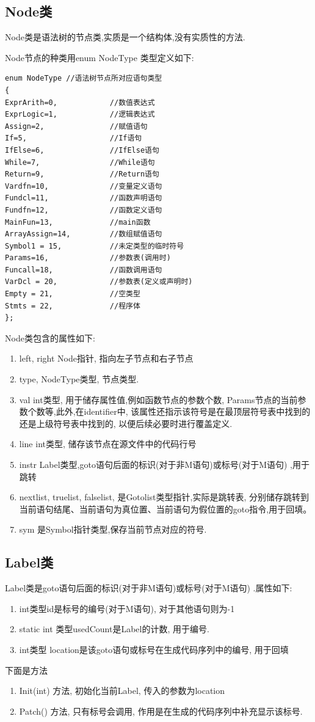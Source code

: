 \documentclass[UTF8]{article}
\begin{document}
\subsection{Node类} 
Node类是语法树的节点类,实质是一个结构体,没有实质性的方法.

Node节点的种类用enum NodeType
类型定义如下:
\begin{lstlisting}
enum NodeType //语法树节点所对应语句类型
{
ExprArith=0,            //数值表达式
ExprLogic=1,            //逻辑表达式
Assign=2,               //赋值语句
If=5,                   //If语句
IfElse=6,               //IfElse语句
While=7,                //While语句
Return=9,               //Return语句
Vardfn=10,              //变量定义语句
Fundcl=11,              //函数声明语句
Fundfn=12,              //函数定义语句
MainFun=13,             //main函数
ArrayAssign=14,         //数组赋值语句
Symbol1 = 15,           //未定类型的临时符号
Params=16,              //参数表(调用时)
Funcall=18,             //函数调用语句
VarDcl = 20,            //参数表(定义或声明时)
Empty = 21,             //空类型
Stmts = 22,             //程序体
};
\end{lstlisting}

Node类包含的属性如下:
\begin{enumerate}[(1)]
\item left, right Node指针, 指向左子节点和右子节点
\item type, NodeType类型, 节点类型.
\item val int类型, 用于储存属性值,例如函数节点的参数个数, Params节点的当前参数个数等,此外,在identifier中, 该属性还指示该符号是在最顶层符号表中找到的还是上级符号表中找到的, 以便后续必要时进行覆盖定义.
\item line int类型, 储存该节点在源文件中的代码行号
\item instr Label类型,goto语句后面的标识(对于非M语句)或标号(对于M语句) ,用于跳转
\item nextlist, truelist, falselist, 是Gotolist类型指针,实际是跳转表, 分别储存跳转到当前语句结尾、当前语句为真位置、当前语句为假位置的goto指令,用于回填。
\item sym 是Symbol指针类型,保存当前节点对应的符号.
\end{enumerate}
\subsection{Label类}
Label类是goto语句后面的标识(对于非M语句)或标号(对于M语句) .属性如下:
\begin{enumerate}[(1)]
\item int类型id是标号的编号(对于M语句), 对于其他语句则为-1
\item static int 类型usedCount是Label的计数, 用于编号.
\item int类型 location是该goto语句或标号在生成代码序列中的编号, 用于回填
\end{enumerate}
下面是方法
\begin{enumerate}[(1)]
\item Init(int) 方法, 初始化当前Label, 传入的参数为location
\item Patch() 方法, 只有标号会调用, 作用是在生成的代码序列中补充显示该标号.
\end{enumerate}
\end{document}
